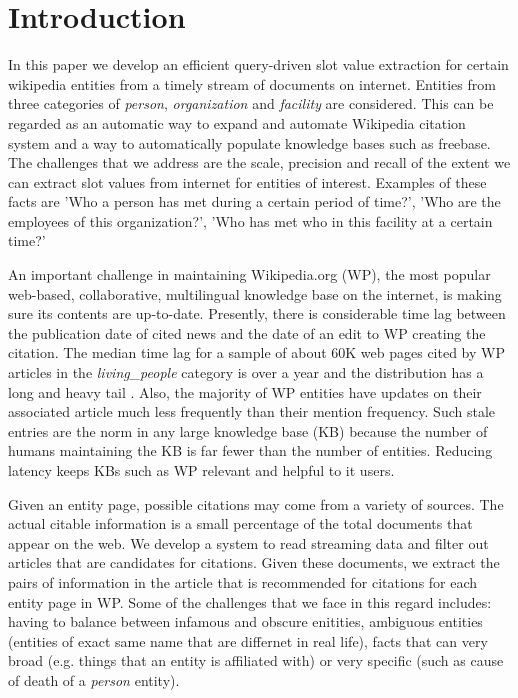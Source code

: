 
\section{Introduction}

In this paper we develop an efficient query-driven slot value extraction for certain wikipedia entities from a timely stream of documents on internet. Entities from three categories of \textit{person}, \textit{organization} and \textit{facility} are considered. This can be regarded as an automatic way to expand and automate Wikipedia citation system and a way to automatically populate knowledge bases such as freebase. The challenges that we address are the scale, precision and recall of the extent we can extract slot values from internet for entities of interest. Examples of these facts are 'Who a person has met during a certain period of time?', 'Who are the employees of this organization?', 'Who has met who in this facility at a certain time?'

 An important challenge in maintaining Wikipedia.org (WP), the most popular web-based, collaborative, multilingual knowledge base on the internet, is making sure its contents are up-to-date. Presently, there is considerable time lag between the publication date of cited news and the date of an edit to WP creating the citation. The median time lag for a sample of about 60K web pages cited by WP articles in the \textit{living\_people} category is over a year and the distribution has a long and heavy tail \cite{JFrank12}. Also, the majority of WP entities have updates on their associated article much less frequently than their mention frequency. Such stale entries are the norm in any large knowledge base (KB) because the number of humans maintaining the KB is far fewer than the number of entities. %
Reducing latency keeps KBs such as WP relevant and helpful to it users.

Given an entity page, possible citations may come from a variety of sources. The actual citable information is a small percentage of the total documents that appear on the web. We develop a system to read streaming data and filter out articles that are candidates for citations. Given these documents, we extract the pairs of information in the article that is recommended for citations for each entity page in  WP. Some of the challenges that we face in this regard includes: having to balance between infamous and obscure enitities, ambiguous entities (entities of exact same name that are differnet in real life), facts that can very broad (e.g. things that an entity is affiliated with) or very specific (such as cause of death of a \textit{person} entity).

